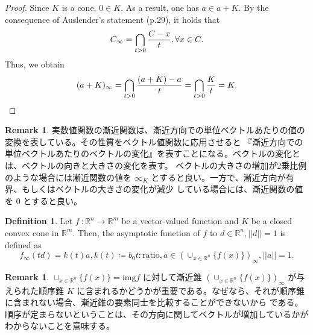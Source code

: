 \documentclass[a4paper,11pt]{jsarticle}
\theoremstyle{definition}
\newtheorem{dfn}[thm]{Definition}
\newtheorem{rem}[thm]{Remark}
\newcommand{\NDemenstionalRealEuclideanSpace}{\mathbb{R}^n}
\newcommand{\MDemenstionalRealEuclideanSpace}{\mathbb{R}^m}
\newcommand{\VectorValuedFunction}[3]{{#1}\:\colon{#2} \to {#3}}
\begin{document}
\begin{proof}
  Since $K$ is a cone, $0 \in K$. As a result, one has $a \in a + K$. By the consequence of Auslender's statement (p.29), it holds that
  \begin{equation}
    C_{\infty} = \bigcap_{t > 0} \frac{C - x}{t}, \forall x \in C. \notag
  \end{equation}
  Thus, we obtain 
  \begin{equation}
    (a + K)_{\infty} = \bigcap_{t > 0} \frac{(a + K) - a}{t} = \bigcap_{t > 0} \frac{K}{t} = K. \notag
  \end{equation}
\end{proof}

\begin{rem}
  実数値関数の漸近関数は、漸近方向での単位ベクトルあたりの値の変換を表している。その性質をベクトル値関数に応用させると
  『漸近方向での単位ベクトルあたりのベクトルの変化』を表すことになる。ベクトルの変化とは、ベクトルの向きと大きさの変化を表す。
  ベクトルの大きさの増加が2乗比例のような場合には漸近関数の値を $\infty_{K}$ とすると良い。一方で、漸近方向が有界、もしくはベクトルの大きさの変化が減少
  している場合には、漸近関数の値を $0$ とすると良い。
\end{rem}

\begin{dfn}\label{dfn1:asymptotic_function}
  Let $\VectorValuedFunction{f}{\NDemenstionalRealEuclideanSpace}{\MDemenstionalRealEuclideanSpace}$ be a vector-valued function 
  and $K$ be a closed convex cone in $\MDemenstionalRealEuclideanSpace$. Then, the asymptotic function of $f$ to $d \in \NDemenstionalRealEuclideanSpace, ||d|| = 1$ is defined as
  \begin{equation}
    f_{\infty}(td) = k(t) a, k(t) \coloneqq b_0 t : \text{ratio}, a \in (\cup_{x \in \NDemenstionalRealEuclideanSpace} \{f(x)\})_{\infty}, ||a|| = 1.
  \end{equation}
\end{dfn}

\begin{rem}
  $\cup_{x \in \NDemenstionalRealEuclideanSpace} \{f(x)\} = \text{img} f$ に対して漸近錐 $(\cup_{x \in \NDemenstionalRealEuclideanSpace} \{f(x)\})_{\infty}$ 
  が与えられた順序錐 $K$ に含まれるかどうかが重要である。なぜなら、それが順序錐に含まれない場合、漸近錐の要素同士を比較することができないから
  である。順序が定まらないということは、その方向に関してベクトルが増加しているかがわからないことを意味する。
\end{rem}
\end{document}
